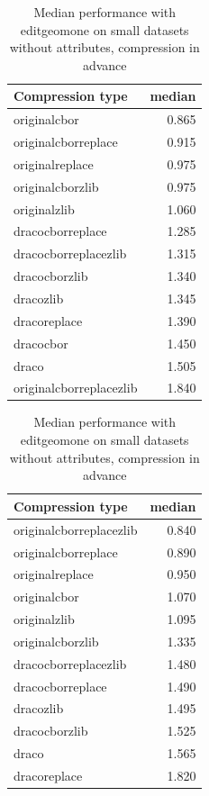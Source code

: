 \begin{table}[!h]
    \begin{minipage}{.5\linewidth}
      \caption{
Median performance with editgeomone on small datasets, compression in advance}
\centering

\begin{tabular}{|l|r|}
\hline
Compression type & median\\
\hline
originalcbor & 0.865\\
\hline
originalcborreplace & 0.915\\
\hline
originalreplace & 0.975\\
\hline
originalcborzlib & 0.975\\
\hline
originalzlib & 1.060\\
\hline
dracocborreplace & 1.285\\
\hline
dracocborreplacezlib & 1.315\\
\hline
dracocborzlib & 1.340\\
\hline
dracozlib & 1.345\\
\hline
dracoreplace & 1.390\\
\hline
dracocbor & 1.450\\
\hline
draco & 1.505\\
\hline
originalcborreplacezlib & 1.840\\
\hline
\end{tabular}
\end{minipage}%
    \begin{minipage}{.5\linewidth}
      \centering
        \caption{
Median performance with editgeomone on small datasets without attributes, compression in advance}

\begin{tabular}{|l|r|}
\hline
Compression type & median\\
\hline
originalcborreplacezlib & 0.840\\
\hline
originalcborreplace & 0.890\\
\hline
originalreplace & 0.950\\
\hline
originalcbor & 1.070\\
\hline
originalzlib & 1.095\\
\hline
originalcborzlib & 1.335\\
\hline
dracocborreplacezlib & 1.480\\
\hline
dracocborreplace & 1.490\\
\hline
dracozlib & 1.495\\
\hline
dracocborzlib & 1.525\\
\hline
draco & 1.565\\
\hline
dracoreplace & 1.820\\
\hline
\end{tabular}
\end{minipage} 
\end{table}

